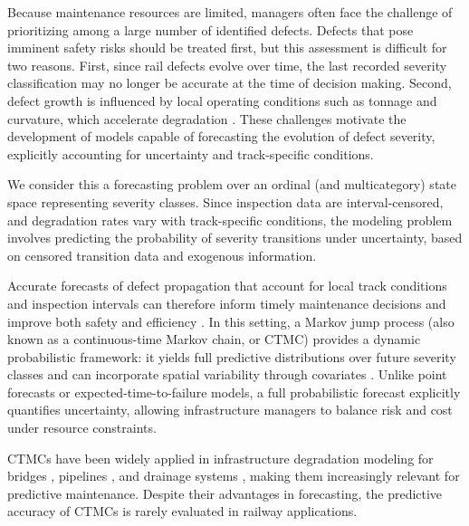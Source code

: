 Because maintenance resources are limited, managers often face the challenge of prioritizing among a large number of identified defects. 
Defects that pose imminent safety risks should be treated first, but this assessment is difficult for two reasons. 
First, since rail defects evolve over time, the last recorded severity classification may no longer be accurate at the time of decision making. 
Second, defect growth is influenced by local operating conditions such as tonnage and curvature, which accelerate degradation \citep{bai2017a,Kumar2008HolisticSweden}.
These challenges motivate the development of models capable of forecasting the evolution of defect severity, explicitly accounting for uncertainty and track-specific conditions.


We consider this a forecasting problem over an ordinal (and multicategory) state space representing severity classes. Since inspection data are interval-censored, and degradation rates vary with track-specific conditions, the modeling problem involves predicting the probability of severity transitions under uncertainty, based on censored transition data and exogenous information.

Accurate forecasts of defect propagation that account for local track conditions and inspection intervals can therefore inform timely maintenance decisions and improve both safety and efficiency \citep{Binder2023}. In this setting, a Markov jump process (also known as a continuous-time Markov chain, or CTMC) provides a dynamic probabilistic framework: it yields full predictive distributions over future severity classes and can incorporate spatial variability through covariates \citep{bisgaard2024A}. Unlike point forecasts or expected-time-to-failure models, a full probabilistic forecast explicitly quantifies uncertainty, allowing infrastructure managers to balance risk and cost under resource constraints.

CTMCs have been widely applied in infrastructure degradation modeling for bridges \citep{Mizutani2023RegimeSwitching}, pipelines \citep{JimenezRoa2024Nonhomogeneous}, and drainage systems \citep{Wu2021ConditionPrediction}, making them increasingly relevant for predictive maintenance. Despite their advantages in forecasting, the predictive accuracy of CTMCs is rarely evaluated in railway applications. 

